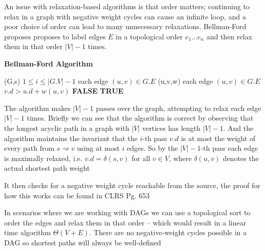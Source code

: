\documentclass[../notes.tex]{subfiles}
\begin{document}

An issue with relaxation-based algorithms is that order matters; continuing to relax in a graph with negative weight cycles can cause an infinite loop, and a poor choice of order can lead to many unnecessary relaxations.
Bellman-Ford proposes proposes to label edges $ E $ in a topological order $  e_1 ... e_n$ and then relax them in that order $ |V| - 1 $ times.


\begin{definition}

	\textbf{Bellman-Ford Algorithm}
\begin{codebox}
\li {}(G,s)
\li \For $ 1 \leq i \leq |G.V| - 1 $ \Do
\li \For each edge $ (u,v) \in G.E $ \Do
\li {}(u,v,w) \End \End
\li \For each edge $ (u,v) \in G.E $ \Do
\li \If $ v.d > u.d + w(u,v)$ \Then
\li \Return \textbf{FALSE} \End \End
\li \Return \textbf{TRUE}
\end{codebox}
	
\end{definition}

The algorithm makes $ |V| - 1 $ passes over the graph, attempting to relax each edge $ |V| - 1 $ times.
Briefly we can see that the algorithm is correct by observing that the longest acyclic path in a graph with $ |V| $ vertices has length $ |V| - 1 $. And the algorithm maintains the invariant that the $ i$-th pass $ v.d $ is at most the weight of every path from $ s \rightsquigarrow v   $ using at most $ i $ edges. So by the $ |V| - 1$-th pass each edge is maximally relaxed, i.e. $ v.d = \delta(s,v) $ for all $ v \in V $, where $ \delta(u,v)$ denotes the actual shortest path weight

It then checks for a negative weight cycle reachable from the source, the proof for how this works can be found in CLRS Pg. 653

In scenarios where we are working with DAGs we can use a topological sort to order the edges and relax them in that order -- which would result in a linear time algorithm $ \Theta(V+E) $. There are no negative-weight cycles possible in a DAG so shortest paths will always be well-defined
\end{document}
